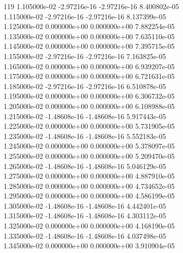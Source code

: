 119	1.105000e-02	-2.97216e-16	-2.97216e-16	8.400802e-05	\\ 	1.115000e-02	-2.97216e-16	-2.97216e-16	8.137399e-05	\\ 	1.125000e-02	0.000000e+00	0.000000e+00	7.882254e-05	\\ 	1.135000e-02	0.000000e+00	0.000000e+00	7.635110e-05	\\ 	1.145000e-02	0.000000e+00	0.000000e+00	7.395715e-05	\\ 	1.155000e-02	-2.97216e-16	-2.97216e-16	7.163825e-05	\\ 	1.165000e-02	0.000000e+00	0.000000e+00	6.939207e-05	\\ 	1.175000e-02	0.000000e+00	0.000000e+00	6.721631e-05	\\ 	1.185000e-02	-2.97216e-16	-2.97216e-16	6.510878e-05	\\ 	1.195000e-02	0.000000e+00	0.000000e+00	6.306732e-05	\\ 	1.205000e-02	0.000000e+00	0.000000e+00	6.108988e-05	\\ 	1.215000e-02	-1.48608e-16	-1.48608e-16	5.917443e-05	\\ 	1.225000e-02	0.000000e+00	0.000000e+00	5.731905e-05	\\ 	1.235000e-02	-1.48608e-16	-1.48608e-16	5.552183e-05	\\ 	1.245000e-02	0.000000e+00	0.000000e+00	5.378097e-05	\\ 	1.255000e-02	0.000000e+00	0.000000e+00	5.209470e-05	\\ 	1.265000e-02	-1.48608e-16	-1.48608e-16	5.046129e-05	\\ 	1.275000e-02	0.000000e+00	0.000000e+00	4.887910e-05	\\ 	1.285000e-02	0.000000e+00	0.000000e+00	4.734652e-05	\\ 	1.295000e-02	0.000000e+00	0.000000e+00	4.586199e-05	\\ 	1.305000e-02	-1.48608e-16	-1.48608e-16	4.442401e-05	\\ 	1.315000e-02	-1.48608e-16	-1.48608e-16	4.303112e-05	\\ 	1.325000e-02	0.000000e+00	0.000000e+00	4.168190e-05	\\ 	1.335000e-02	-1.48608e-16	-1.48608e-16	4.037498e-05	\\ 	1.345000e-02	0.000000e+00	0.000000e+00	3.910904e-05	\\ \hline
